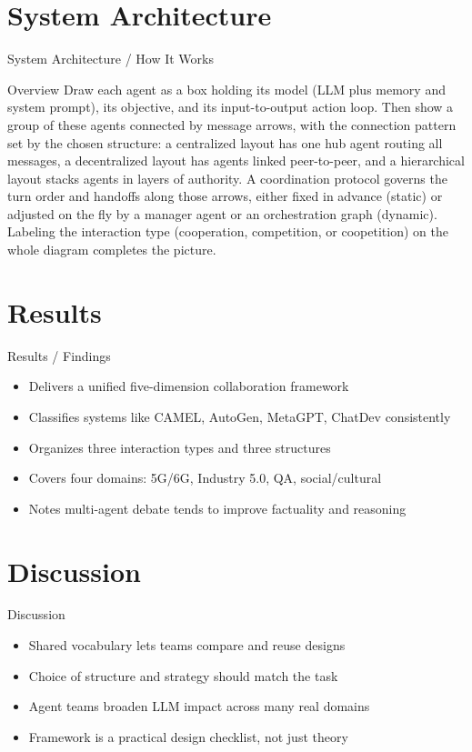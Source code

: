 \documentclass[10pt]{beamer}
\begin{document}
\section{System Architecture}
\begin{frame}{System Architecture / How It Works}
  \begin{block}{Overview}
  Draw each agent as a box holding its model (LLM plus memory and system prompt), its objective, and its input-to-output action loop. Then show a group of these agents connected by message arrows, with the connection pattern set by the chosen structure: a centralized layout has one hub agent routing all messages, a decentralized layout has agents linked peer-to-peer, and a hierarchical layout stacks agents in layers of authority. A coordination protocol governs the turn order and handoffs along those arrows, either fixed in advance (static) or adjusted on the fly by a manager agent or an orchestration graph (dynamic). Labeling the interaction type (cooperation, competition, or coopetition) on the whole diagram completes the picture.
  \end{block}
\end{frame}

\section{Results}
\begin{frame}[allowframebreaks]{Results / Findings}
\begin{itemize}
  \item Delivers a unified five-dimension collaboration framework
  \item Classifies systems like CAMEL, AutoGen, MetaGPT, ChatDev consistently
  \item Organizes three interaction types and three structures
  \item Covers four domains: 5G/6G, Industry 5.0, QA, social/cultural
  \item Notes multi-agent debate tends to improve factuality and reasoning
\end{itemize}
\end{frame}

\section{Discussion}
\begin{frame}{Discussion}
\begin{itemize}
  \item Shared vocabulary lets teams compare and reuse designs
  \item Choice of structure and strategy should match the task
  \item Agent teams broaden LLM impact across many real domains
  \item Framework is a practical design checklist, not just theory
\end{itemize}
\end{frame}
\end{document}
